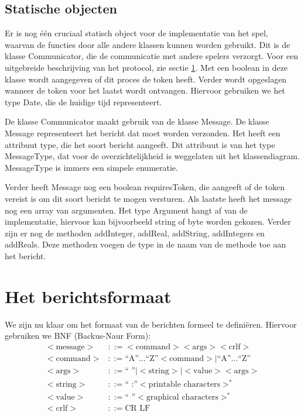 \documentclass[a4paper,11pt]{article}
\newcommand{\protoref}{sectie \ref{sec:protocol}}
\begin{document}
\subsection{Statische objecten}
Er is nog \'e\'en cruciaal statisch object voor de implementatie van het spel, waarvan de functies door alle andere klassen kunnen worden gebruikt. Dit is de klasse Communicator, die de communicatie met andere spelers verzorgt.  Voor een uitgebreide beschrijving van het protocol, zie \protoref. Met een boolean in deze klasse wordt aangegeven of dit proces de token heeft. Verder wordt opgeslagen wanneer de token voor het laatst wordt ontvangen. Hiervoor gebruiken we het type Date, die de huidige tijd representeert.

De klasse Communicator maakt gebruik van de klasse Message. De klasse Message representeert het bericht dat moet worden verzonden. Het heeft een attribuut type, die het soort bericht aangeeft. Dit attribuut is van het type MessageType, dat voor de overzichtelijkheid is weggelaten uit het klassendiagram. MessageType is immers een simpele enumeratie.

Verder heeft Message nog een boolean requiresToken, die aangeeft of de token vereist is om dit soort bericht te mogen versturen.  Als laatste heeft het message nog een array van argumenten. Het type Argument hangt af van de implementatie, hiervoor kan bijvoorbeeld string of byte worden gekozen. Verder zijn er nog de methoden addInteger, addReal, addString, addIntegers en addReals. Deze methoden voegen de type in de naam van de methode toe aan het bericht.

    \section{Het berichtsformaat}
    \label{sec:protocol}
    We zijn nu klaar om het formaat van de berichten formeel te defini\"eren. Hiervoor gebruiken we BNF (Backus-Naur Form):
    \begin{align*}
    <\text{message}> &::= <\text{command}> <\text{args}> <\text{crlf}> \\
    <\text{command}> &::= \text{``A''...``Z''} <\text{command}> | \text{``A''...``Z''} \\
    <\text{args}>    &::= \text{`` ''} | <\text{string}> | <\text{value}> <\text{args}> \\
    <\text{string}>  &::= \text{`` :''} <\text{printable characters}>^{*} \\
    <\text{value}>   &::= \text{`` ''}  <\text{graphical characters}>^{*} \\
    <\text{crlf}>    &::= \text{CR LF}
    \end{align*}
\end{document}
